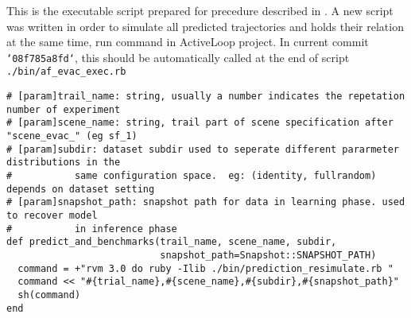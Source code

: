 This is the executable script prepared for precedure described in . A new script was 
written in order to simulate all predicted trajectories and holds their relation at the same time, run command in 
ActiveLoop project. In current commit \texttt{`08f785a8fd`}, this should be automatically called at the end of 
script \texttt{./bin/af_evac_exec.rb}

\begin{verbatim}
# [param]trail_name: string, usually a number indicates the repetation number of experiment
# [param]scene_name: string, trail part of scene specification after "scene_evac_" (eg sf_1)
# [param]subdir: dataset subdir used to seperate different pararmeter distributions in the
#           same configuration space.  eg: (identity, fullrandom) depends on dataset setting
# [param]snapshot_path: snapshot path for data in learning phase. used to recover model
#           in inference phase
def predict_and_benchmarks(trail_name, scene_name, subdir,
                           snapshot_path=Snapshot::SNAPSHOT_PATH)
  command = +"rvm 3.0 do ruby -Ilib ./bin/prediction_resimulate.rb "
  command << "#{trial_name},#{scene_name},#{subdir},#{snapshot_path}"
  sh(command)
end
\end{verbatim}

